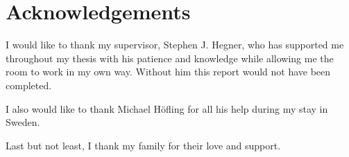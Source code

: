 \chapter{Acknowledgements}
\label{chap:acknowledgements}
I would like to thank my supervisor, Stephen J. Hegner, who has supported me 
throughout my thesis with his patience and knowledge 
while allowing me the room to work in my own way. 
Without him this report would not have been completed.

I also would like to thank Michael H\"ofling for all his help during my stay in Sweden. 

Last but not least, I thank my family for their love and support.